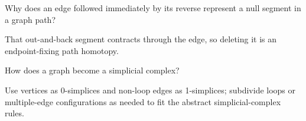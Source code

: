 \begin{problem}\label{prob:viii14-19}
Why does an edge followed immediately by its reverse represent a null segment in a graph path?
\end{problem}
\begin{solution}
That out-and-back segment contracts through the edge, so deleting it is an endpoint-fixing path homotopy.
\end{solution}

\begin{problem}\label{prob:viii14-20}
How does a graph become a simplicial complex?
\end{problem}
\begin{solution}
Use vertices as 0-simplices and non-loop edges as 1-simplices; subdivide loops or multiple-edge configurations as needed to fit the abstract simplicial-complex rules.
\end{solution}

